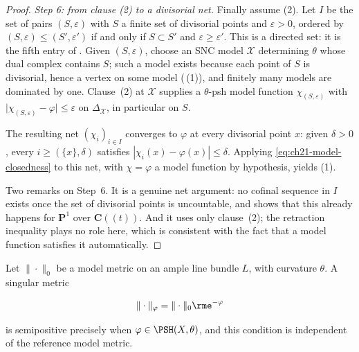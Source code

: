 \begin{proof}
\emph{Step 6: from clause \textup{(2)} to a divisorial net.}
Finally assume (2).  Let \(I\) be the set of pairs \((S,\varepsilon)\) with
\(S\) a finite set of divisorial points and \(\varepsilon>0\), ordered by
\((S,\varepsilon)\leq(S',\varepsilon')\) if and only if \(S\subset S'\) and
\(\varepsilon\geq\varepsilon'\).  This is a directed set: it is the fifth
entry of .  Given \((S,\varepsilon)\),
choose an SNC model \(\mathcal X\) determining \(\theta\) whose dual complex
contains \(S\); such a model exists because each point of \(S\) is
divisorial, hence a vertex on some model
(\,(1)), and finitely many models are
dominated by one.  Clause~(2) at \(\mathcal X\) supplies a \(\theta\)-psh
model function \(\chi_{(S,\varepsilon)}\) with
\(\lvert\chi_{(S,\varepsilon)}-\varphi\rvert\leq\varepsilon\) on
\(\Delta_{\mathcal X}\), in particular on \(S\).

The resulting net \((\chi_i)_{i\in I}\) converges to \(\varphi\) at every
divisorial point \(x\): given \(\delta>0\), every
\(i\geq(\{x\},\delta)\) satisfies \(|\chi_i(x)-\varphi(x)|\leq\delta\).
Applying \eqref{eq:ch21-model-closedness} to this net, with \(\chi=\varphi\)
a model function by hypothesis, yields (1).

Two remarks on Step~6.  It is a genuine net argument: no cofinal sequence in
\(I\) exists once the set of divisorial points is uncountable, and
 shows that this already happens for
\(\mathbf P^1\) over \(\mathbf C((t))\).  And it uses only clause~(2); the
retraction inequality plays no role here, which is consistent with the fact
that a model function satisfies it automatically.
\end{proof}

\begin{corollary}\label{cor:ch21-reference-independence}
Let \(\|\cdot\|_0\) be a model metric on an ample line bundle \(L\), with
curvature \(\theta\).  A singular metric

\begin{equation}
\label{eq:ch21-singular-metric}
                         \|\cdot\|_\varphi
                         =\|\cdot\|_0\rme^{-\varphi}
\end{equation}

is semipositive precisely when \(\varphi\in\PSH(X,\theta)\), and this
condition is independent of the reference model metric.
\end{corollary}

